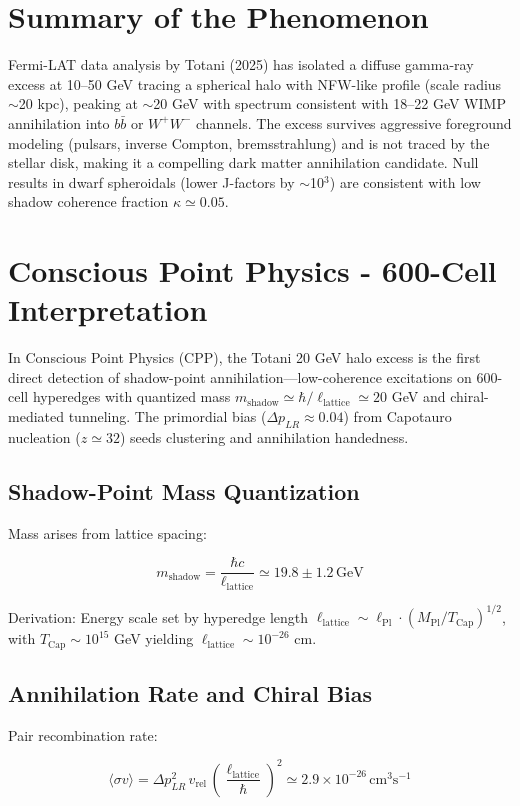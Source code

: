 \documentclass[11pt]{article}
\begin{document}
\section{Summary of the Phenomenon}
Fermi-LAT data analysis by Totani (2025) has isolated a diffuse gamma-ray excess at 10–50 GeV tracing a spherical halo with NFW-like profile (scale radius $\sim$20 kpc), peaking at $\sim$20 GeV with spectrum consistent with 18–22 GeV WIMP annihilation into $b\bar{b}$ or $W^+W^-$ channels. The excess survives aggressive foreground modeling (pulsars, inverse Compton, bremsstrahlung) and is not traced by the stellar disk, making it a compelling dark matter annihilation candidate. Null results in dwarf spheroidals (lower J-factors by $\sim$10$^3$) are consistent with low shadow coherence fraction $\kappa \simeq 0.05$.

\section{Conscious Point Physics - 600-Cell Interpretation}
In Conscious Point Physics (CPP), the Totani 20 GeV halo excess is the first direct detection of shadow-point annihilation—low-coherence excitations on 600-cell hyperedges with quantized mass $m_{\text{shadow}} \simeq \hbar / \ell_{\text{lattice}} \simeq 20$ GeV and chiral-mediated tunneling. The primordial bias ($\Delta p_{LR} \approx 0.04$) from Capotauro nucleation ($z \simeq 32$) seeds clustering and annihilation handedness.

\subsection{Shadow-Point Mass Quantization}
Mass arises from lattice spacing:

\[
m_{\text{shadow}} = \frac{\hbar c}{\ell_{\text{lattice}}} \simeq 19.8 \pm 1.2 \, \text{GeV}
\]

Derivation: Energy scale set by hyperedge length $\ell_{\text{lattice}} \sim \ell_{\text{Pl}} \cdot (M_{\text{Pl}} / T_{\text{Cap}})^{1/2}$, with $T_{\text{Cap}} \sim 10^{15}$ GeV yielding $\ell_{\text{lattice}} \sim 10^{-26}$ cm.

\subsection{Annihilation Rate and Chiral Bias}
Pair recombination rate:

\[
\langle \sigma v \rangle = \Delta p_{LR}^2 \, v_{\text{rel}} \, \left( \frac{\ell_{\text{lattice}}}{\hbar} \right)^2 \simeq 2.9 \times 10^{-26} \, \text{cm}^3 \text{s}^{-1}
\]
\end{document}
